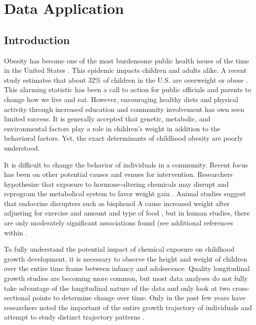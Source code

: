 \chapter{Data Application}
\section{Introduction}
Obesity has become one of the most burdensome public health issues of the time in the United States \cite{surgeon2001}.  This epidemic impacts children and adults alike.  A recent study estimates that about 32\% of children in the U.S. are overweight or obese \cite{ogden2008}. This alarming statistic has been a call to action for public officials and parents to change how we live and eat. However, encouraging healthy diets and physical activity through increased education and community involvement has own seen limited success.  It is generally accepted that genetic, metabolic, and environmental factors play a role in children's weight in addition to the behavioral factors. Yet, the exact determinants of childhood obesity are poorly understood.

It is difficult to change the behavior of individuals in a community. Recent focus has been on other potential causes and venues for intervention. Researchers hypothesize that exposure to hormone-altering chemicals may disrupt and reprogram the metabolical system to favor weight gain \cite{tuma2007}. Animal studies suggest that endocrine disrupters such as bisphenol A cause increased weight after adjusting for exercise and amount and type of food \cite{rubin2001,rubin2009}, but in human studies, there are only moderately significant associations found \cite{mendez2011} (see additional references within \cite{harley2013}.
 
 To fully understand the potential impact of chemical exposure on childhood growth development, it is necessary to observe the height and weight of children over the entire time frame between infancy and adolescence. Quality longitudinal growth studies are becoming more common, but most data analyses do not fully take advantage of the longitudinal nature of the data and only look at two cross-sectional points to determine change over time. Only in the past few years have researchers noted the important of the entire growth trajectory of individuals and attempt to study distinct trajectory patterns \cite{pryor2011,carter2012,li2007,garden2012}. 


